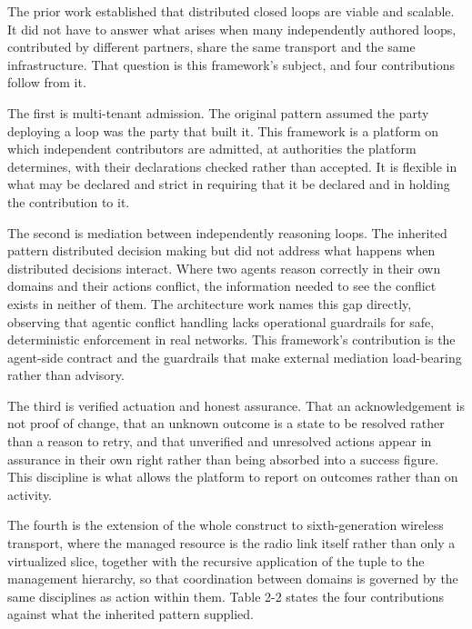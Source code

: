 The prior work established that distributed closed loops are viable and
scalable. It did not have to answer what arises when many independently
authored loops, contributed by different partners, share the same
transport and the same infrastructure. That question is this framework's
subject, and four contributions follow from it.

The first is multi-tenant admission. The original pattern assumed the
party deploying a loop was the party that built it. This framework is a
platform on which independent contributors are admitted, at authorities
the platform determines, with their declarations checked rather than
accepted. It is flexible in what may be declared and strict in requiring
that it be declared and in holding the contribution to it.

The second is mediation between independently reasoning loops. The
inherited pattern distributed decision making but did not address what
happens when distributed decisions interact. Where two agents reason
correctly in their own domains and their actions conflict, the
information needed to see the conflict exists in neither of them. The
architecture work names this gap directly, observing that agentic
conflict handling lacks operational guardrails for safe, deterministic
enforcement in real networks. This framework's contribution is the
agent-side contract and the guardrails that make external mediation
load-bearing rather than advisory.

The third is verified actuation and honest assurance. That an
acknowledgement is not proof of change, that an unknown outcome is a
state to be resolved rather than a reason to retry, and that unverified
and unresolved actions appear in assurance in their own right rather
than being absorbed into a success figure. This discipline is what
allows the platform to report on outcomes rather than on activity.

The fourth is the extension of the whole construct to sixth-generation
wireless transport, where the managed resource is the radio link itself
rather than only a virtualized slice, together with the recursive
application of the tuple to the management hierarchy, so that
coordination between domains is governed by the same disciplines as
action within them. Table 2-2 states the four contributions against what
the inherited pattern supplied.

